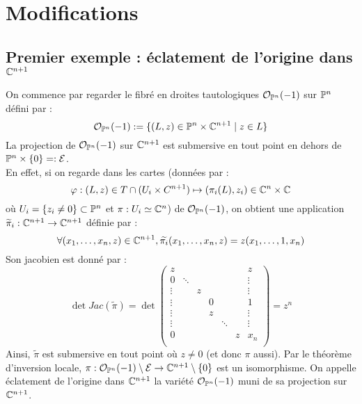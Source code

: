 \documentclass[a4page,10pt]{article}
\begin{document}

\fi
\section{Modifications}
\subsection{Premier exemple : \'eclatement de l'origine dans $\C^{n+1}$}
On commence par regarder le fibr\'e en droites tautologiques $ \Ocal_{\P^n}(-1)$ sur $\P^n$ d\'efini par :
\[ \Ocal_{\P^n}(-1):= \{ (L,z) \in \P^n\times \C^{n+1} \mid z \in L \}
\]
La projection de $\Ocal_{\P^n}(-1)$ sur $\C^{n+1}$ est submersive en tout point en dehors de $\P^n\times\{0\}=:\Ecal$. \\
En effet, si on regarde dans les cartes (donn\'ees par : 
	\[\varphi :(L,z) \in T \cap (U_i \times C^{n+1}) \mapsto (\pi_i(L),z_i)\in \C^n \times \C
\]
 o\`u $U_i=\{z_i \neq 0\} \subset \P^n$ et $\pi : U_i \simeq \C^n$) 
de $\Ocal_{\P^n}(-1)$, on obtient une application $\widetilde{\pi}_i : \C^{n+1} \to \C^{n+1}$ d\'efinie par :
\[  \forall (x_1,\ldots,x_n,z) \in \C^{n+1}, \widetilde{\pi_i}(x_1,\ldots,x_n,z)=z(x_1,\ldots,1,x_n)
\]
Son jacobien est donn\'e par :
\[
 \det Jac(\widetilde{\pi})=\det\begin{pmatrix}
    z&&&&&&z \\
    0&\ddots&&&&&\vdots\\
    \vdots&&z&&&&\vdots\\
    \vdots&&&0&&&1\\
    \vdots&&&z&&&\vdots\\
    \vdots&&&&\ddots&&\vdots\\
    0&&&&&z&x_n\\
    \end{pmatrix}=z^n
  \]
  Ainsi, $\widetilde{\pi}$ est submersive en tout point o\`u $z \neq 0$ (et donc $\pi$ aussi).
  Par le th\'eor\`eme d'inversion locale, $\pi : \Ocal_{\P^n}(-1)\setminus \Ecal \to \C^{n+1} \setminus \{0\}$ est un isomorphisme. On appelle \'eclatement de l'origine dans $\C^{n+1}$ la vari\'et\'e $\Ocal_{\P^n}(-1)$ muni de sa projection sur $\C^{n+1}$.
\end{document}
